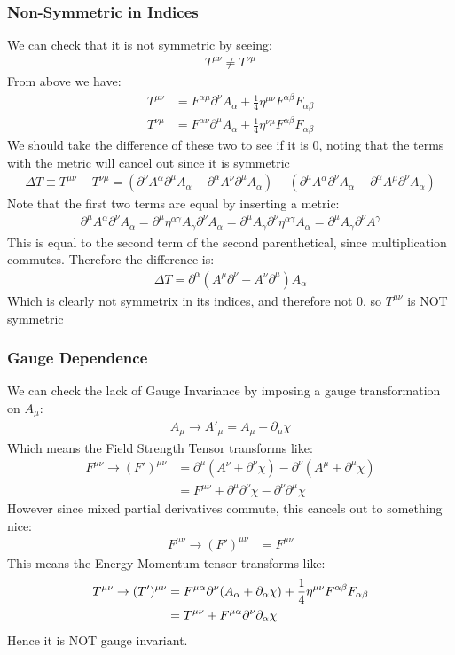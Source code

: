 \documentclass[12pt]{article}
\newcommand{\D}{\partial}
\begin{document}
\subsubsection{Non-Symmetric in Indices}
We can check that it is not symmetric by seeing:
\begin{align*}
  T^{\mu\nu}\neq T^{\nu\mu}
\end{align*}
From above we have:
\begin{align*}
  T^{\mu\nu}&=F^{\alpha\mu}\D^\nu A_\alpha
  +\frac14\eta^{\mu\nu}F^{\alpha\beta}F_{\alpha\beta}\\
  T^{\nu\mu}&=F^{\alpha\nu}\D^\mu A_\alpha
  +\frac14\eta^{\nu\mu}F^{\alpha\beta}F_{\alpha\beta}
\end{align*}
We should take the difference of these two to see if it is $0$, noting that the terms with the metric will cancel out since it is symmetric
\begin{align*}
  \Delta T\equiv T^{\mu\nu}-T^{\nu\mu}=
  (\D^\nu A^\alpha\D^\mu A_\alpha-\D^\alpha A^\nu\D^\mu A_\alpha)-
  (\D^\mu A^\alpha\D^\nu A_\alpha-\D^\alpha A^\mu\D^\nu A_\alpha)
\end{align*}
Note that the first two terms are equal by inserting a metric:
\begin{align*}
  \D^\mu A^\alpha\D^\nu A_\alpha=\D^\mu\eta^{\alpha\gamma}A_\gamma\D^\nu A_\alpha=
  \D^\mu A_\gamma\D^\nu\eta^{\alpha\gamma}A_\alpha=
  \D^\mu A_\gamma\D^\nu A^\gamma
\end{align*}
This is equal to the second term of the second parenthetical, since multiplication commutes. Therefore the difference is:
\begin{align*}
  \Delta T=\D^\alpha(A^\mu \D^\nu-A^\nu\D^\mu)A_\alpha
\end{align*}
Which is clearly not symmetrix in its indices, and therefore not 0, so $T^{\mu\nu}$ is NOT symmetric

\subsubsection{Gauge Dependence}
We can check the lack of Gauge Invariance by imposing a gauge transformation on $A_\mu$:
\begin{align*}
  A_\mu\to A'_\mu=A_\mu+\D_\mu\chi
\end{align*}
Which means the Field Strength Tensor transforms like:
\begin{align*}
  F^{\mu\nu}\to (F')^{\mu\nu}&=
  \D^\mu(A^\nu+\D^\nu\chi)-\D^\nu(A^\mu+\D^\mu\chi)\\
  &=F^{\mu\nu}+\D^\mu\D^\nu\chi-\D^\nu\D^\mu\chi
\end{align*}
However since mixed partial derivatives commute, this cancels out to something nice:
\begin{align*}
  F^{\mu\nu}\to (F')^{\mu\nu}&=F^{\mu\nu}
\end{align*}
This means the Energy Momentum tensor transforms like:
\begin{align*}
  T^{\mu\nu}\to (T')^{\mu\nu}&=F^{\mu\alpha}\D^\nu\qty(A_\alpha+\D_\alpha\chi)
  +\frac14\eta^{\mu\nu}F^{\alpha\beta}F_{\alpha\beta}\\
  &=T^{\mu\nu}+F^{\mu\alpha}\D^\nu\D_\alpha\chi
\end{align*}
Hence it is NOT gauge invariant.
\end{document}
